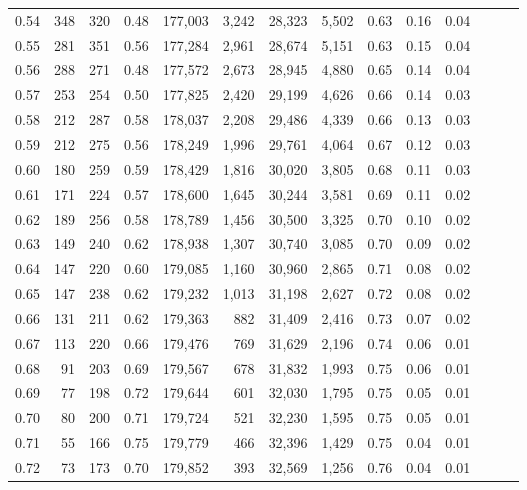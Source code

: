\begin{tabular}{rrrrrrrrrrrrrr}
0.54 &    348 &  320 &  0.48 &  177,003 &    3,242 &  28,323 &   5,502 &  0.63 &  0.16 &      0.04 \\
0.55 &    281 &  351 &  0.56 &  177,284 &    2,961 &  28,674 &   5,151 &  0.63 &  0.15 &      0.04 \\
0.56 &    288 &  271 &  0.48 &  177,572 &    2,673 &  28,945 &   4,880 &  0.65 &  0.14 &      0.04 \\
0.57 &    253 &  254 &  0.50 &  177,825 &    2,420 &  29,199 &   4,626 &  0.66 &  0.14 &      0.03 \\
0.58 &    212 &  287 &  0.58 &  178,037 &    2,208 &  29,486 &   4,339 &  0.66 &  0.13 &      0.03 \\
0.59 &    212 &  275 &  0.56 &  178,249 &    1,996 &  29,761 &   4,064 &  0.67 &  0.12 &      0.03 \\
0.60 &    180 &  259 &  0.59 &  178,429 &    1,816 &  30,020 &   3,805 &  0.68 &  0.11 &      0.03 \\
0.61 &    171 &  224 &  0.57 &  178,600 &    1,645 &  30,244 &   3,581 &  0.69 &  0.11 &      0.02 \\
0.62 &    189 &  256 &  0.58 &  178,789 &    1,456 &  30,500 &   3,325 &  0.70 &  0.10 &      0.02 \\
0.63 &    149 &  240 &  0.62 &  178,938 &    1,307 &  30,740 &   3,085 &  0.70 &  0.09 &      0.02 \\
0.64 &    147 &  220 &  0.60 &  179,085 &    1,160 &  30,960 &   2,865 &  0.71 &  0.08 &      0.02 \\
0.65 &    147 &  238 &  0.62 &  179,232 &    1,013 &  31,198 &   2,627 &  0.72 &  0.08 &      0.02 \\
0.66 &    131 &  211 &  0.62 &  179,363 &      882 &  31,409 &   2,416 &  0.73 &  0.07 &      0.02 \\
0.67 &    113 &  220 &  0.66 &  179,476 &      769 &  31,629 &   2,196 &  0.74 &  0.06 &      0.01 \\
0.68 &     91 &  203 &  0.69 &  179,567 &      678 &  31,832 &   1,993 &  0.75 &  0.06 &      0.01 \\
0.69 &     77 &  198 &  0.72 &  179,644 &      601 &  32,030 &   1,795 &  0.75 &  0.05 &      0.01 \\
0.70 &     80 &  200 &  0.71 &  179,724 &      521 &  32,230 &   1,595 &  0.75 &  0.05 &      0.01 \\
0.71 &     55 &  166 &  0.75 &  179,779 &      466 &  32,396 &   1,429 &  0.75 &  0.04 &      0.01 \\
0.72 &     73 &  173 &  0.70 &  179,852 &      393 &  32,569 &   1,256 &  0.76 &  0.04 &      0.01 \\

\end{tabular}
